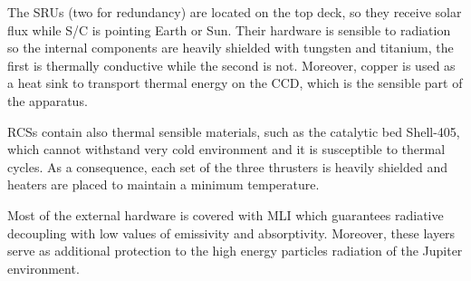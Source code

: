     The SRUs (two for redundancy) are located on the top deck, so they receive solar flux while S/C is pointing Earth or Sun. Their hardware is sensible to radiation so the internal components are heavily shielded with tungsten and titanium, the first is thermally conductive while the second is not. 
    Moreover, copper is used as a heat sink to transport thermal energy on the CCD, which is the sensible part of the apparatus.\cite{MAG_info}

    RCSs contain also thermal sensible materials, such as the catalytic bed Shell-405, which cannot withstand very cold environment and it is susceptible to thermal cycles. As a consequence, each set of the three thrusters is heavily shielded and heaters are placed to maintain a minimum temperature. \cite{Leros}

    Most of the external hardware is covered with MLI which guarantees radiative decoupling with low values of emissivity and absorptivity. Moreover, these layers serve as additional protection to the high energy particles radiation of the Jupiter environment.


